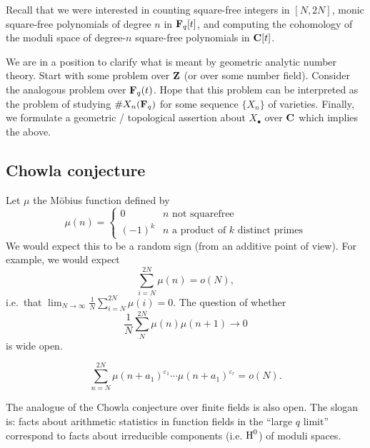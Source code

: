 Recall that we were interested in counting square-free integers in 
$[N, 2 N]$, monic square-free polynomials of degree $n$ in $\mathbf{F}_q[t]$, and 
computing the cohomology of the moduli space of degree-$n$ square-free 
polynomials in $\mathbf{C}[t]$. 

We are in a position to clarify what is meant by geometric analytic number 
theory. Start with some problem over $\mathbf{Z}$ (or over some number field). 
Consider the analogous problem over $\mathbf{F}_q(t)$. Hope that this problem can be 
interpreted as the problem of studying $\# X_n(\mathbf{F}_q)$ for some sequence 
$\{X_n\}$ of varieties. Finally, we formulate a geometric / topological 
assertion about $X_\bullet$ over $\mathbf{C}$ which implies the above. 




\subsection{Chowla conjecture}

Let $\mu$ the M\"obius function defined by 
\[
  \mu(n) = \begin{cases} 0 & n\text{ not squarefree} \\ (-1)^k & n\text{ a product of $k$ distinct primes} \end{cases}
\]
We would expect this to be a random sign (from an additive point of view). For 
example, we would expect 
\[
  \sum_{i=N}^{2 N} \mu(n) = o(N) ,
\]
i.e.\ that $\lim_{N\to \infty} \frac{1}{N}\sum_{i=N}^{2 N} \mu(i) = 0$. The 
question of whether 
\[
  \frac 1 N \sum_N^{2 N} \mu(n) \mu(n+1) \to 0
\]
is wide open. 

\begin{conjecture}[Chowla]
\[
  \sum_{n=N}^{2 N} \mu(n+a_1)^{\varepsilon_1} \cdots \mu(n+a_1)^{\varepsilon_r} = o(N) .
\]
\end{conjecture}

The analogue of the Chowla conjecture over finite fields is also open. The 
slogan is: facts about arithmetic statistics in function fields in the ``large 
$q$ limit'' correspond to facts about irreducible components (i.e. $\operatorname{H}^0$) of 
moduli spaces. 

